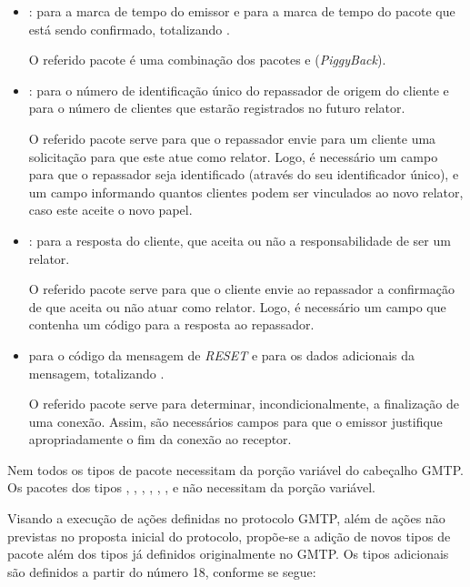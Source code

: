 \begin{itemize}
	\item {}:  para a marca de tempo do emissor e  para a marca de tempo do pacote que está sendo confirmado, totalizando . 
	
	O referido pacote é uma combinação dos pacotes  e  (\textit{PiggyBack}).
	
	\item {}:  para o número de identificação único do repassador de origem do cliente e  para o número de clientes que estarão registrados no futuro relator.
	
	O referido pacote serve para que o repassador envie para um cliente uma solicitação para que este atue como relator. Logo, é necessário um campo para que o repassador seja identificado (através do seu identificador único), e um campo informando quantos clientes podem ser vinculados ao novo relator, caso este aceite o novo papel.
	
	\item {}:  para a resposta do cliente, que aceita ou não a responsabilidade de ser um relator.
	
	O referido pacote serve para que o cliente envie ao repassador a confirmação de que aceita ou não atuar como relator. Logo, é necessário um campo que contenha um código para a resposta ao repassador.
	
	\item {}  para o código da mensagem de \textit{RESET} e  para os dados adicionais da mensagem, totalizando .
	
	O referido pacote serve para determinar, incondicionalmente, a finalização de uma conexão. Assim, são necessários campos para que o emissor justifique apropriadamente o fim da conexão ao receptor.
	
\end{itemize}

Nem todos os tipos de pacote necessitam da porção variável do cabeçalho GMTP. Os pacotes dos tipos , , , , , ,  e  não necessitam da porção variável.

Visando a execução de ações definidas no protocolo GMTP, além de ações não previstas no proposta inicial do protocolo, propõe-se a adição de novos tipos de pacote além dos tipos já definidos originalmente no GMTP.
Os tipos adicionais são definidos a partir do número 18, conforme se segue:

